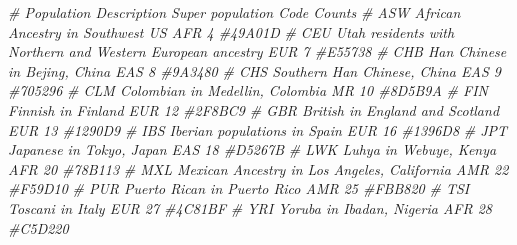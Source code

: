 \documentclass[
]{book}
\newenvironment{Shaded}{\begin{snugshade}}{\end{snugshade}}
\newcommand{\CommentTok}[1]{\textcolor[rgb]{0.56,0.35,0.01}{\textit{#1}}}
\begin{document}
\begin{Shaded}
\begin{Highlighting}[]
\CommentTok{\# Population    Description Super population    Code    Counts}
\CommentTok{\# ASW   African Ancestry in Southwest US                              AFR   4     \#49A01D}
\CommentTok{\# CEU   Utah residents with Northern and Western European ancestry  EUR 7     \#E55738}
\CommentTok{\# CHB   Han Chinese in Bejing, China                                  EAS   8     \#9A3480}
\CommentTok{\# CHS   Southern Han Chinese, China                                 EAS 9     \#705296}
\CommentTok{\# CLM   Colombian in Medellin, Colombia                             MR  10    \#8D5B9A}
\CommentTok{\# FIN   Finnish in Finland                                          EUR 12  \#2F8BC9}
\CommentTok{\# GBR   British in England and Scotland                             EUR 13  \#1290D9}
\CommentTok{\# IBS   Iberian populations in Spain                                  EUR   16  \#1396D8}
\CommentTok{\# JPT   Japanese in Tokyo, Japan                                      EAS   18  \#D5267B}
\CommentTok{\# LWK   Luhya in Webuye, Kenya                                      AFR 20  \#78B113}
\CommentTok{\# MXL   Mexican Ancestry in Los Angeles, California                 AMR 22  \#F59D10}
\CommentTok{\# PUR   Puerto Rican in Puerto Rico                                 AMR 25  \#FBB820}
\CommentTok{\# TSI   Toscani in Italy                                              EUR   27  \#4C81BF}
\CommentTok{\# YRI   Yoruba in Ibadan, Nigeria                                     AFR   28  \#C5D220}


\end{Highlighting}
\end{Shaded}
\end{document}
